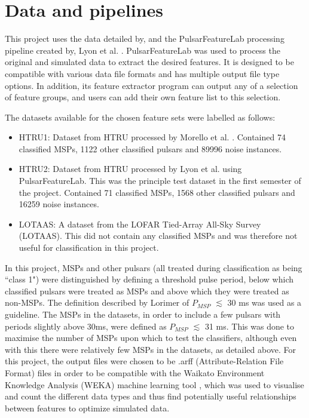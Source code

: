 \documentclass[12pt]{article}
\begin{document}
\section{Data and pipelines}
This project uses the data detailed by, and the PulsarFeatureLab processing pipeline created by, Lyon et al. \cite{lyon2016fifty}. PulsarFeatureLab was used to process the original and simulated data to extract the desired features. It is designed to be compatible with various data file formats and has multiple output file type options. In addition, its feature extractor program can output any of a selection of feature groups, and users can add their own feature list to this selection.

The datasets available for the chosen feature sets were labelled as follows:
\begin{itemize}
\item HTRU1: Dataset from HTRU processed by Morello et al. \cite{morello2014spinn}. Contained 74 classified MSPs, 1122 other classified pulsars and 89996 noise instances.
\item HTRU2: Dataset from HTRU processed by Lyon et al. \cite{lyon2016fifty} using PulsarFeatureLab. This was the principle test dataset in the first semester of the project. Contained 71 classified MSPs, 1568 other classified pulsars and 16259 noise instances.
\item LOTAAS: A dataset from the LOFAR Tied-Array All-Sky Survey (LOTAAS). This did not contain any classified MSPs and was therefore not useful for classification in this project.
\end{itemize}

In this project, MSPs and other pulsars (all treated during classification as being ``class 1") were distinguished by defining a threshold pulse period, below which classified pulsars were treated as MSPs and above which they were treated as non-MSPs. The definition described by Lorimer \cite{lorimer2008binary} of $P_{MSP}$ $\lesssim$ 30 ms was used as a guideline. The MSPs in the datasets, in order to include a few pulsars with periods slightly above 30ms, were defined as $P_{MSP}$ $\lesssim$ 31 ms. This was done to maximise the number of MSPs upon which to test the classifiers, although even with this there were relatively few MSPs in the datasets, as detailed above. For this project, the output files were chosen to be .arff (Attribute-Relation File Format) files in order to be compatible with the Waikato Environment Knowledge Analysis (WEKA) machine learning tool \cite{hall2009weka}, which was used to visualise and count the different data types and thus find potentially useful relationships between features to optimize simulated data.
\end{document}
